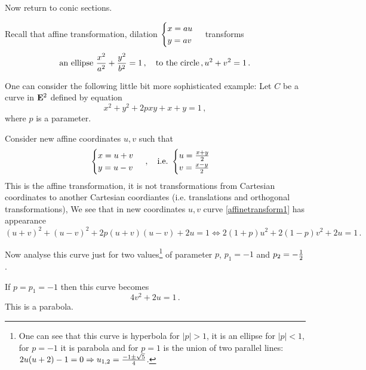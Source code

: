 \documentclass[12pt]{article}
\numberwithin{equation}{section}
\begin{document}
\bigskip

Now return to conic sections.

Recall that affine transformation,
dilation $\begin{cases}x=au\cr y=av\end{cases}$
transforms 
                     \begin{equation}\label{ellipsetothecircle}
               \hbox {an ellipse}\,\,
         {x^2\over a^2}+
         {y^2\over b^2}=1\,,\quad
        \hbox{to the circle}\,,
                u^2+v^2=1\,.
              \end{equation}

   One can consider the following
little bit more sophisticated 
 example:  Let $C$ be a curve in ${\bf E}^2$ defined
   by equation
            \begin{equation}\label{affinetransform1}
            x^2+y^2+2pxy+x+y=1\,,
                 \end{equation}
where $p$ is a parameter.

      Consider new affine coordinates  $u,v$ such that
               \begin{equation*}
               \begin{cases}
           x=u+v\cr y=u-v\cr
                  \end{cases}
          \,,\quad {\rm i.e.}\,\,
               \begin{cases}
           u={x+y\over 2}\cr v={x-y\over 2}\cr
                  \end{cases}
               \end{equation*}
This is the affine transformation, it is not
 transformations from Cartesian
coordinates to another Cartesian coordiantes
(i.e. translations and orthogonal transformations),  
 We see that in new coordinates $u,v$ curve \eqref{affinetransform1}
has appearance
                  $$
 (u+v)^2+(u-v)^2+2p(u+v)(u-v)+2u=1\Leftrightarrow
   2(1+p)u^2+2(1-p)v^2+2u=1\,.
          $$





\m 


Now analyse this curve just for
two values\footnote{ One can see that this curve is hyperbola for
$|p|>1$, it is an ellipse for $|p|<1$, for $p=-1$ 
it is parabola and for $p=1$
is the union of two parallel lines:
  $2u(u+2)-1=0
     \Rightarrow 
   u_{1,2}={-1\pm \sqrt 5\over 4}$.
}
of parameter
$p$, $p_1=-1$ and $p_2=-{1\over 2}$.

 If $p=p_1=-1$ then this curve becomes
           \begin{equation}\label{parabolaforp1}
           4v^2+2u=1\,.   
         \end{equation}
This is a parabola.
\end{document}
